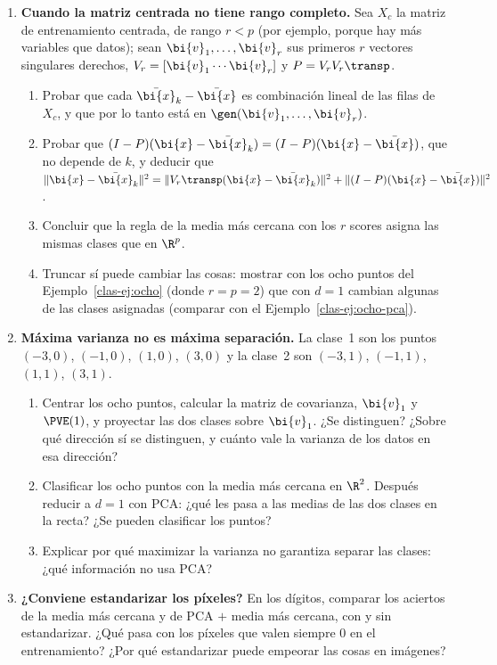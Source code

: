 \begin{enumerate}[leftmargin=*,label=\textbf{\thechapter.\arabic*},ref=\thechapter.\arabic*,itemsep=4pt]
\item {} \textbf{Cuando la matriz centrada no tiene rango
completo.}\label{clas-ej:rango} Sea $X_c$ la matriz de entrenamiento centrada,
de rango $r<p$ (por ejemplo, porque hay más variables que datos); sean
$\bi{v}_1,\dots,\bi{v}_r$ sus primeros $r$ vectores singulares derechos,
$V_r=[\bi{v}_1\cdots \bi{v}_r]$ y $P=V_rV_r\transp$.
\begin{enumerate}[label=(\alph*)]
\item Probar que cada $\bar{\bi{x}}_k-\bar{\bi{x}}$ es combinación lineal de las filas de
$X_c$, y que por lo tanto está en $\gen(\bi{v}_1,\dots,\bi{v}_r)$.
\item Probar que $(I-P)(\bi{x}-\bar{\bi{x}}_k)=(I-P)(\bi{x}-\bar{\bi{x}})$, que no depende de $k$,
y deducir que
$\|\bi{x}-\bar{\bi{x}}_k\|^2=\|V_r\transp(\bi{x}-\bar{\bi{x}}_k)\|^2+\|(I-P)(\bi{x}-\bar{\bi{x}})\|^2$.
\item Concluir que la regla de la media más cercana con los $r$ scores asigna
las mismas clases que en $\R^p$.
\item Truncar sí puede cambiar las cosas: mostrar con los ocho puntos del
Ejemplo~\ref{clas-ej:ocho} (donde $r=p=2$) que con $d=1$ cambian algunas de
las clases asignadas (comparar con el Ejemplo~\ref{clas-ej:ocho-pca}).
\end{enumerate}

\item {} \textbf{Máxima varianza no es máxima separación.}\label{clas-ej:dos-rectas}
La clase~1 son los puntos $(-3,0)$, $(-1,0)$, $(1,0)$, $(3,0)$ y la clase~2 son
$(-3,1)$, $(-1,1)$, $(1,1)$, $(3,1)$.
\begin{enumerate}[label=(\alph*)]
\item Centrar los ocho puntos, calcular la matriz de covarianza, $\bi{v}_1$ y
$\PVE(1)$, y proyectar las dos clases sobre $\bi{v}_1$. ¿Se distinguen? ¿Sobre qué
dirección sí se distinguen, y cuánto vale la varianza de los datos en esa
dirección?
\item Clasificar los ocho puntos con la media más cercana en $\R^2$. Después
reducir a $d=1$ con PCA: ¿qué les pasa a las medias de las dos clases en la
recta? ¿Se pueden clasificar los puntos?
\item Explicar por qué maximizar la varianza no garantiza separar las clases:
¿qué información no usa PCA?
\end{enumerate}

\item {} \textbf{¿Conviene estandarizar los píxeles?}\label{clas-ej:pixeles}
En los dígitos, comparar los aciertos de la media más cercana y de PCA $+$
media más cercana, con y sin estandarizar. ¿Qué pasa con los píxeles que
valen siempre $0$ en el entrenamiento? ¿Por qué estandarizar puede empeorar
las cosas en imágenes?


\end{enumerate}
